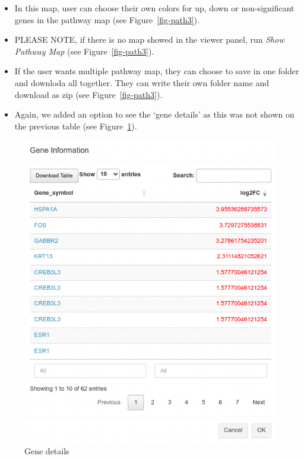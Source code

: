 \documentclass[
  a4paper,
  oneside,
  open=any]{scrreport}
\begin{document}
\begin{itemize}
\item
  In this map, user can choose their own colors for up, down or
  non-significant genes in the pathway map (see Figure~\ref{fig-path3}).
\item
  PLEASE NOTE, if there is no map showed in the viewer panel, run
  \emph{Show Pathway Map} (see Figure~\ref{fig-path3}).
\item
  If the user wants multiple pathway map, they can choose to save in one
  folder and downloda all together. They can write their own folder name
  and download as zip (see Figure~\ref{fig-path3}).
\item
  Again, we added an option to see the `gene details' as this was not
  shown on the previous table (see Figure~\ref{fig-path4}).
\end{itemize}

\begin{figure}[H]

{\centering \includegraphics{./images/pathway/path4.png}

}

\caption{\label{fig-path4}Gene details}

\end{figure}
\end{document}
